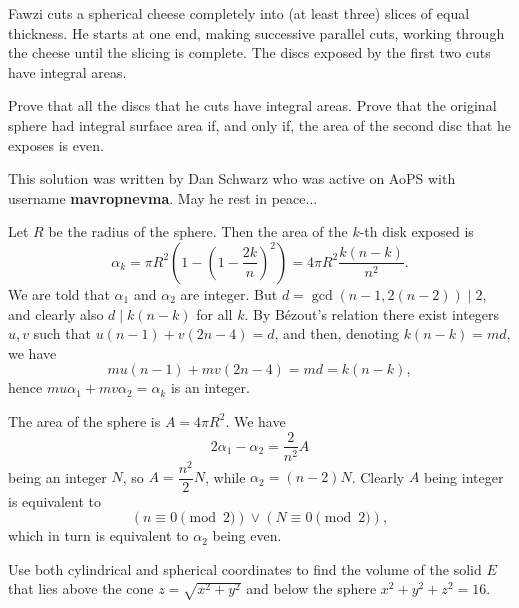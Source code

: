 \begin{question}[name={2012 Gulf Math Olympiad}]
	Fawzi cuts a spherical cheese completely into (at least three) slices of equal thickness. He starts at one end, making successive parallel cuts, working through the cheese until the slicing is complete. The discs exposed by the first two cuts have integral areas.
	\begin{tasks}
		\task Prove that all the discs that he cuts have integral areas.
		\task Prove that the original sphere had integral surface area if, and only if, the area of the second disc that he exposes is even.
	\end{tasks}
\end{question}





\begin{solution}[name={Solution by Mavropnevma}] 
	This solution was written by Dan Schwarz who was active on AoPS with username \textbf{mavropnevma}. May he rest in peace...
	\begin{tasks}
		\task Let $R$ be the radius of the sphere. Then the area of the $k$-th disk exposed is $$\alpha_k = \pi R^2 \left (1 - \left ( 1 - \frac {2k} {n}\right )^2\right ) = 4\pi R^2 \frac {k(n-k)} {n^2}.$$ We are told that $\alpha_1$ and $\alpha_2$ are integer. But $d = \gcd(n-1, 2(n-2)) \mid 2$, and clearly also $d\mid k(n-k)$ for all $k$. By Bézout's relation there exist integers $u,v$ such that $u(n-1) + v(2n-4) = d$, and then, denoting $k(n-k) = md$, we have $$mu(n-1) + mv(2n-4) = md = k(n-k),$$ hence $mu\alpha_1 + mv\alpha_2 = \alpha_k$ is an integer.
		
		\task The area of the sphere is $A = 4\pi R^2$. We have $$2\alpha_1 - \alpha_2 =  \dfrac {2} {n^2} A$$ being an integer $N$, so $A = \dfrac {n^2} {2} N$, while $\alpha_2 = (n-2) N$. Clearly $A$ being integer is equivalent to $$(n\equiv 0 \pmod{2}) \lor (N\equiv 0 \pmod{2}),$$ which in turn is equivalent to $\alpha_2$ being even.
	\end{tasks}
\end{solution}





\begin{question}[name={Cylindrical and Spherical Coordinates by Mathwizarddude}]
	Use both cylindrical and spherical coordinates to find the volume of the solid $ E$ that lies above the cone $ z = \sqrt {x^2 + y^2}$ and below the sphere $ x^2 + y^2 + z^2 = 16$.
\end{question}

